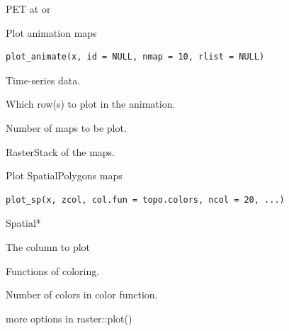 \documentclass[a4paper]{book}
\begin{document}
%
\begin{Value}
PET at  or 
\end{Value}
%
\begin{Description}\relax
Plot animation maps
\end{Description}
%
\begin{Usage}
\begin{verbatim}
plot_animate(x, id = NULL, nmap = 10, rlist = NULL)
\end{verbatim}
\end{Usage}
%
\begin{Arguments}
\begin{ldescription}
\item[\code{x}] Time-series data.

\item[\code{id}] Which row(s) to plot in the animation.

\item[\code{nmap}] Number of maps to be plot.

\item[\code{rlist}] RasterStack of the maps.
\end{ldescription}
\end{Arguments}
%
\begin{Description}\relax
Plot SpatialPolygons maps
\end{Description}
%
\begin{Usage}
\begin{verbatim}
plot_sp(x, zcol, col.fun = topo.colors, ncol = 20, ...)
\end{verbatim}
\end{Usage}
%
\begin{Arguments}
\begin{ldescription}
\item[\code{x}] Spatial*

\item[\code{zcol}] The column to plot

\item[\code{col.fun}] Functions of coloring.

\item[\code{ncol}] Number of colors in color function.

\item[\code{...}] more options in raster::plot()
\end{ldescription}
\end{Arguments}
\end{document}
